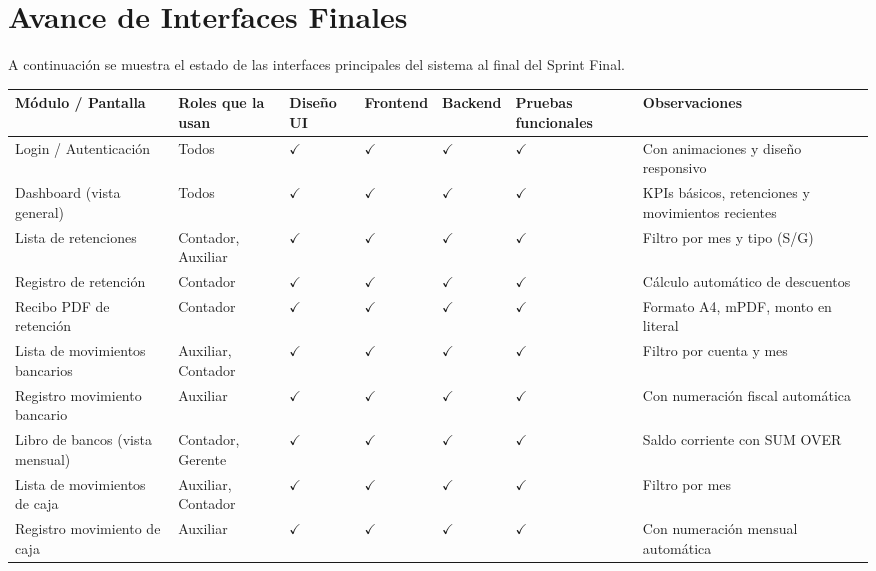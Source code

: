 \documentclass[stu]{apa7}
\begin{document}
\section{Avance de Interfaces Finales}

A continuación se muestra el estado de las interfaces principales del sistema al final del Sprint Final.

\begin{longtable}{|L{3.5cm}|L{2.5cm}|C{1.5cm}|C{1.5cm}|C{1.5cm}|C{1.5cm}|L{3cm}|}
\hline
{}
\textbf{Módulo / Pantalla} & \textbf{Roles que la usan} & \textbf{Diseño UI} & \textbf{Frontend} & \textbf{Backend} & \textbf{Pruebas funcionales} & \textbf{Observaciones} \\
\hline
Login / Autenticación & Todos & $\checkmark$ & $\checkmark$ & $\checkmark$ & $\checkmark$ & Con animaciones y diseño responsivo \\
\hline
Dashboard (vista general) & Todos & $\checkmark$ & $\checkmark$ & $\checkmark$ & $\checkmark$ & KPIs básicos, retenciones y movimientos recientes \\
\hline
Lista de retenciones & Contador, Auxiliar & $\checkmark$ & $\checkmark$ & $\checkmark$ & $\checkmark$ & Filtro por mes y tipo (S/G) \\
\hline
Registro de retención & Contador & $\checkmark$ & $\checkmark$ & $\checkmark$ & $\checkmark$ & Cálculo automático de descuentos \\
\hline
Recibo PDF de retención & Contador & $\checkmark$ & $\checkmark$ & $\checkmark$ & $\checkmark$ & Formato A4, mPDF, monto en literal \\
\hline
Lista de movimientos bancarios & Auxiliar, Contador & $\checkmark$ & $\checkmark$ & $\checkmark$ & $\checkmark$ & Filtro por cuenta y mes \\
\hline
Registro movimiento bancario & Auxiliar & $\checkmark$ & $\checkmark$ & $\checkmark$ & $\checkmark$ & Con numeración fiscal automática \\
\hline
Libro de bancos (vista mensual) & Contador, Gerente & $\checkmark$ & $\checkmark$ & $\checkmark$ & $\checkmark$ & Saldo corriente con SUM OVER \\
\hline
Lista de movimientos de caja & Auxiliar, Contador & $\checkmark$ & $\checkmark$ & $\checkmark$ & $\checkmark$ & Filtro por mes \\
\hline
Registro movimiento de caja & Auxiliar & $\checkmark$ & $\checkmark$ & $\checkmark$ & $\checkmark$ & Con numeración mensual automática \\
\hline

\end{longtable}
\end{document}
